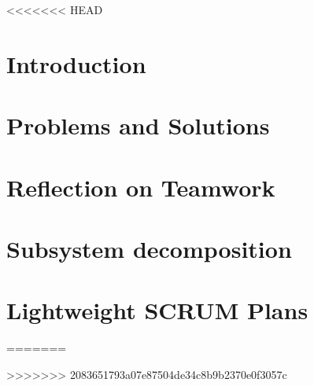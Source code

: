 \documentclass[english,a4paper,pdftex]{report}
\begin{document}

\newpage

\tableofcontents

<<<<<<< HEAD
\section{Introduction}
\label{sec:intro}

\section{Problems and Solutions}
\label{sec:problems}

\section{Reflection on Teamwork}
\label{sec:reflection}

\section{Subsystem decomposition}
\label{sec:subsystem}

\section{Lightweight SCRUM Plans}
\label{sec:scrum}

\newpage

%
\printglossaries
\appendix


=======
%

\newpage

\newpage


\appendix

>>>>>>> 2083651793a07e87504de34c8b9b2370e0f3057c
\end{document}
